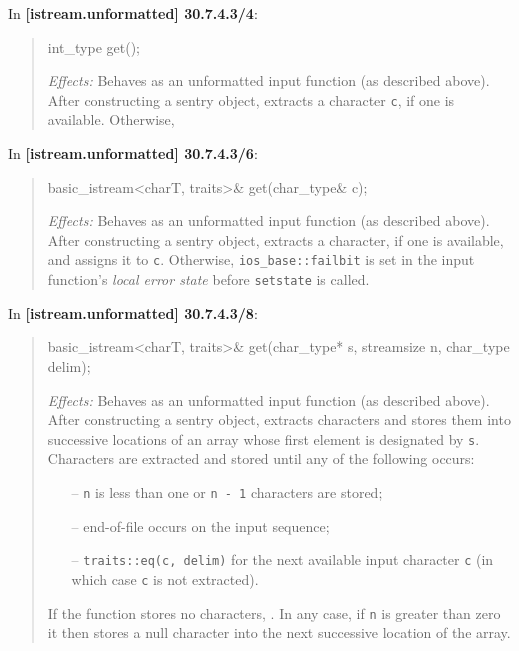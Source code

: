 \documentclass{wg21}
\begin{document}
In \textbf{[istream.unformatted] 30.7.4.3/4}:
\begin{quote}
\begin{codeblock}
int_type get();
\end{codeblock}
\textit{Effects:} Behaves as an unformatted input function (as described above).
After constructing a sentry object, extracts a character \texttt{c}, if one is
available. Otherwise, 
\end{quote}

In \textbf{[istream.unformatted] 30.7.4.3/6}:
\begin{quote}
\begin{codeblock}
basic_istream<charT, traits>& get(char_type& c);
\end{codeblock}
\textit{Effects:} Behaves as an unformatted input function (as described above).
After constructing a sentry object, extracts a character, if one is available,
and assigns it to \texttt{c}. Otherwise, 
{\texttt{ios_base::failbit} is set in the input function's \textit{local error state}
before \texttt{setstate} is called}.
\end{quote}

In \textbf{[istream.unformatted] 30.7.4.3/8}:
\begin{quote}
\begin{codeblock}
basic_istream<charT, traits>& get(char_type* s, streamsize n, char_type delim);
\end{codeblock}
\textit{Effects:} Behaves as an unformatted input function (as described above).
After constructing a sentry object, extracts characters and stores them into
successive locations of an array whose first element is designated by \texttt{s}.
Characters are extracted and stored until any of the following occurs:
\begin{itemize}
  \item[--] \texttt{n} is less than one or \texttt{n - 1} characters are stored;
  \item[--] end-of-file occurs on the input sequence;
  \item[--] \texttt{traits::eq(c, delim)} for the next available input character
            \texttt{c} (in which case \texttt{c} is not extracted).
\end{itemize}
If the function stores no characters, .
In any case, if \texttt{n} is greater than zero it then stores a
null character into the next successive location of the array.
\end{quote}
\end{document}
